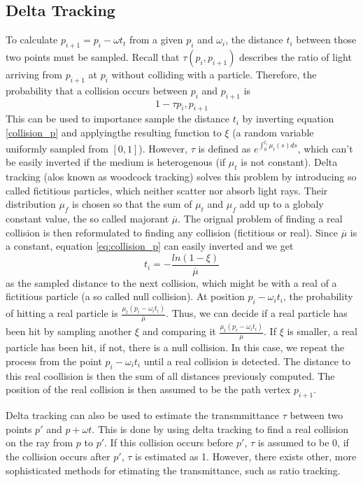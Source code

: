 \subsection{Delta Tracking}
To calculate $p_{i+1} = p_i - \omega t_t$ from a given $p_i$ and $\omega_i$, the distance $t_i$ between those two points must be sampled. Recall that $\tau(p_i, p_{i+1})$ describes the ratio of light arriving from $p_{i+1}$ at $p_i$ without colliding with a particle. Therefore, the probability that a collision occurs between $p_i$ and $p_{i+1}$ is 
\begin{equation} \label{eq:collision_p}
1 - \tau{p_i, p_{i+1}}
\end{equation}
This can be used to importance sample the distance $t_i$ by inverting equation \ref{collision_p} and applyingthe resulting function to $\xi$ (a random variable uniformly sampled from $[0,1]$). However, $\tau$ is defined as $e^{\int_{0}^{t_i}\mu_t(s)ds}$, which can't be easily inverted if the medium is heterogenous (if $\mu_t$ is not constant).
Delta tracking (alos known as woodcock tracking) solves this problem by introducing so called fictitious particles, which neither scatter nor absorb light rays. Their distribution $\mu_f$ is chosen so that the sum of $\mu_t$ and $\mu_f$ add up to a globaly constant value, the so called majorant $\overline{\mu}$.
The orignal problem of finding a real collision is then reformulated to finding any collision (fictitious or real).
Since $\overline{\mu}$ is a constant, equation \ref{eq:collision_p} can easily inverted and we get
\begin{equation}
t_i = - \frac{ln(1 - \xi)}{\overline{\mu}}
\end{equation} 
as the sampled distance to the next collision, which might be with a real of a fictitious particle (a so called null collision).
At position $p_i - \omega_i t_i$, the probability of hitting a real particle is $\frac{\mu_t(p_i - \omega_i t_i)}{\overline{\mu}}$. Thus, we can decide if a real particle has been hit by sampling another $\xi$ and comparing it  $\frac{\mu_t(p_i - \omega_i t_i)}{\overline{\mu}}$. If $\xi$ is smaller, a real particle has been hit, if not, there is a null collision.
In this case, we repeat the process from the point $p_i - \omega_i t_i$ until a real collision is detected. The distance to this real coollision is then the sum of all distances previously computed.
The position of the real collision is then assumed to be the path vertex $p_{i+1}$.

Delta tracking can also be used to estimate the transmmittance $\tau$ between two points $p'$ and $p + \omega t$. This is done by using delta tracking to find a real collision on the ray from $p$ to $p'$. If this collision occurs before $p'$, $\tau$ is assumed to be 0, if the collision occurs after $p'$, $\tau$ is estimated as 1. However, there exists other, more sophisticated methods for etimating the transmittance, such as ratio tracking.
